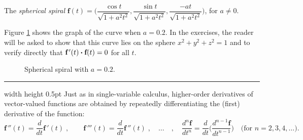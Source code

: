 \begin{exmp}\label{exmp:sphspiral}
 The \emph{spherical spiral}
 $\textbf{f}(t) = \biggl( \dfrac{\cos t}{\sqrt{1 + a^2 t^2}},\dfrac{\sin t}{\sqrt{1 + a^2 t^2}},
  \dfrac{-at}{\sqrt{1 + a^2 t^2}} \biggr)$, for $a \ne 0$.\vspace{1.5mm}
  \par\noindent Figure \ref{fig:sphspiral} shows the graph of the curve when $a = 0.2$. In the exercises, the reader will be asked to
  show that this curve lies on the sphere $x^2 + y^2 + z^2 = 1$ and to verify directly that
  $\textbf{f}\,'(t) \bm{\cdot} \textbf{f}(t) = 0$ for all $t$.\vspace{-18mm}
 \begin{figure}[h]
  \begin{center}
   
  \end{center}\vspace{0mm}
 \caption[]{\quad Spherical spiral with $a = 0.2$.}
 \label{fig:sphspiral}
 \end{figure}
\end{exmp}\vspace{-0mm}
\hrule width \textwidth height 0.5pt
\vskip3mm
Just as in single-variable calculus, higher-order derivatives of vector-valued functions are obtained by repeatedly
differentiating the (first) derivative of the function:
\begin{displaymath}
 \textbf{f}\,''(t) = \dfrac{d}{dt} \textbf{f}\,'(t) \; , \qquad \textbf{f}\,'''(t) = \dfrac{d}{dt} \textbf{f}\,''(t) \;
 , \quad \ldots \quad , \quad \dfrac{d^{n}\textbf{f}}{dt^{n}} =
 \dfrac{d}{dt} \biggl( \dfrac{d^{n-1}\textbf{f}}{dt^{n-1}} \biggr) \text{~~~(for $n = 2, 3, 4,\ldots$).}
\end{displaymath}

